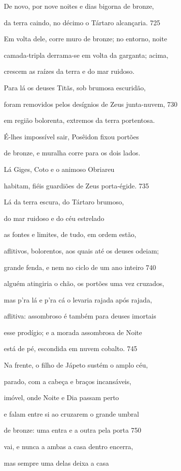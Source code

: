 De novo, por nove noites e dias bigorna de bronze,

da terra caindo, no décimo o Tártaro alcançaria. \num{725}

Em volta dele, corre muro de bronze; no entorno, noite

camada-tripla derrama-se em volta da garganta; acima,

crescem as raízes da terra e do mar ruidoso.

\quad{}Para lá os deuses Titãs, sob brumosa escuridão,

foram removidos pelos desígnios de Zeus junta-nuvem, \num{730}

em região bolorenta, extremos da terra portentosa.

É-lhes impossível sair, Posêidon fixou portões

de bronze, e muralha corre para os dois lados.

\quad{}Lá Giges, Coto e o animoso Obriareu

habitam, fiéis guardiões de Zeus porta-égide. \num{735}

\quad{}Lá da terra escura, do Tártaro brumoso,

do mar ruidoso e do céu estrelado

as fontes e limites, de tudo, em ordem estão,

aflitivos, bolorentos, aos quais até os deuses odeiam;

grande fenda, e nem no ciclo de um ano inteiro \num{740}

alguém atingiria o chão, os portões uma vez cruzados,

mas p'ra lá e p'ra cá o levaria rajada após rajada,

aflitiva: assombroso é também para deuses imortais

esse prodígio; e a morada assombrosa de Noite

está de pé, escondida em nuvem cobalto. \num{745}

\quad{}Na frente, o filho de Jápeto sustém o amplo céu,

parado, com a cabeça e braços incansáveis,

imóvel, onde Noite e Dia passam perto

e falam entre si ao cruzarem o grande umbral

de bronze: uma entra e a outra pela porta \num{750}

vai, e nunca a ambas a casa dentro encerra,

mas sempre uma delas deixa a casa

